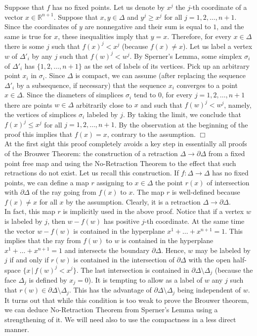 \documentclass[leqno, 11pt]{article}\usepackage{latexsym}\usepackage{amsmath, amscd}\usepackage{amssymb}
\begin{document}
Suppose that $f$ has no fixed points. Let us denote by $x^j$ the $j$-th coordinate of a vector $x\in{\mathbb R}^{n+1}$. 
Suppose that $x,y\in\Delta$ and $y^j\geqslant x^j$ for all $j=1,2,\ldots,n+1$. Since the coordinates of $y$ are nonnegative and 
their sum is equal to $1$, and the same is true for $x$, these inequalities imply that $y=x$. Therefore,
for every $x\in\Delta$ there is some $j$ such that $f(x)^j<x^j$ (because $f(x)\neq x$).
Let us label a vertex $w$ of  $\Delta'_i$ by any $j$ such that $f(w)^j<w^j$. 
By Sperner's Lemma, some simplex $\sigma_i$ of $\Delta'_i$ has
$\{1,2,\ldots, n+1\}$ as the set of labels of its vertices. Pick up an arbitrary point $x_i$ in $\sigma_i$. Since $\Delta$ is compact, we can assume (after replacing the sequence $\Delta'_i$ by a subsequence, if necessary) that the sequence $x_i$ converges to a point $x\in\Delta$. Since the diameters of simplices $\sigma_i$ tend to $0$, for every $j=1,2,\ldots, n+1$ there are points $w\in\Delta$ arbitrarily close to $x$ and such that $f(w)^j<w^j$, namely, the vertices of simplices $\sigma_i$ labeled by $j$. By taking the limit, we conclude that $f(x)^j\leqslant x^j$ 
for all $j = 1,2,\ldots, n+1$. By the observation at the beginning of the proof this implies that $f(x)=x$, contrary to the assumption. $\Box$\\

At the first sight this proof completely avoids a key step in essentially all proofs of the Brouwer Theorem: the construction of a retraction $\Delta\rightarrow\partial\Delta$ from a fixed point free map and using the No-Retraction Theorem to the effect that such retractions do not exist. 
Let us recall this construction. If $f:\Delta\rightarrow\Delta$ has no fixed points, 
we can define a  map $r$ assigning to $x\in\Delta$ the point $r(x)$ of intersection with $\partial\Delta$ of the ray going from $f(x)$ to $x$. 
The map $r$ is well-defined because $f(x)\neq x$ for all $x$ by the assumption. 
Clearly, it is a retraction $\Delta\rightarrow\partial\Delta$.\\

In fact, this map $r$ is implicitly used in the above proof. 
Notice that if a vertex $w$ is labeled by $j$, then $w-f(w)$ has positive $j$-th coordinate. At the same time the vector
$w-f(w)$ is contained in the hyperplane $x^1+\ldots+x^{n+1}=1$. This implies that the ray from $f(w)$ to $w$ is contained in the hyperplane $x^1+\ldots+x^{n+1}=1$ and intersects the boundary $\partial\Delta$. Hence, $w$ may be labeled by $j$ if and only if $r(w)$ is contained in the intersection of $\partial\Delta$ with the open half-space $\{x\,|\, f(w)^j<x^j\}$. 
The last intersection is contained in $\partial\Delta\setminus\Delta_j$ (because the face $\Delta_j$ is defined by $x_j=0$). 
It is tempting to allow as a label of $w$ any $j$ such that $r(w)\in\partial\Delta\setminus\Delta_j$. 
This has the advantage of $\partial\Delta\setminus\Delta_j$ being independent of $w$. It turns out that while this condition is too weak to
prove the Brouwer theorem, we can deduce No-Retraction Theorem from Sperner's Lemma using a strengthening of it. 
We will need also to use the compactness in a less direct manner. 
\end{document}
